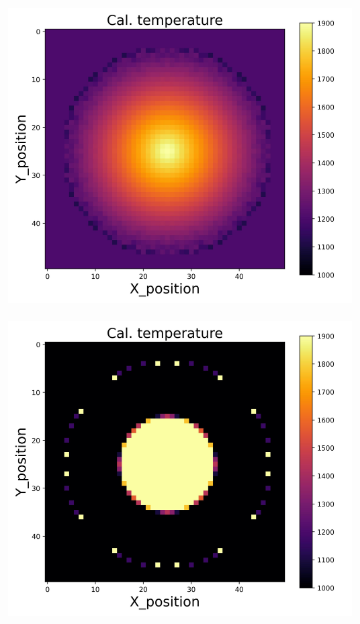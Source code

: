 {\begin{figure}[p]
\begin{minipage}{\textwidth}
\begin{subfigure}{0.325\textwidth}
        \end{subfigure}
        \begin{subfigure}{0.325\textwidth}
            \centering
            \includegraphics[width=\textwidth]{figures/raw_data/26/exp/T_cal.jpg}
        \end{subfigure}
        \begin{subfigure}{0.325\textwidth}
            \centering
            \includegraphics[width=\textwidth]{figures/raw_data/31/exp/T_cal.jpg}

\end{subfigure}
\end{minipage}
\end{figure}}
